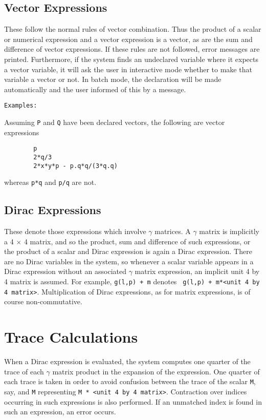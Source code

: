 \subsection{Vector Expressions} 

These follow the normal rules of vector combination. Thus the product of a
scalar or numerical expression and a vector expression is a vector, as are
the sum and difference of vector expressions. If these rules are not
followed, error messages are printed. Furthermore, if the system finds an
undeclared variable where it expects a vector variable, it will ask the
user in interactive mode whether to make that variable a vector or not. In
batch mode, the declaration will be made automatically and the user
informed of this by a message.

{\tt Examples:}

Assuming {\tt P} and {\tt Q} have been declared vectors, the following are
vector expressions
\begin{verbatim}
        p
        2*q/3
        2*x*y*p - p.q*q/(3*q.q)
\end{verbatim}
whereas {\tt p*q} and {\tt p/q} are not.

\subsection{Dirac Expressions}

These denote those expressions which involve $\gamma$ matrices. A $\gamma$
matrix is implicitly a 4 $\times$ 4 matrix, and so the product, sum and
difference of such expressions, or the product of a scalar and Dirac
expression is again a Dirac expression.  There are no Dirac variables in
the system, so whenever a scalar variable appears in a Dirac expression
without an associated $\gamma$ matrix expression, an implicit unit 4
by 4 matrix is assumed.  For example, {\tt g(l,p) + m} denotes {\tt
g(l,p) + m*<unit 4 by 4 matrix>}.  Multiplication of Dirac
expressions, as for matrix expressions, is of course non-commutative.

\section{Trace Calculations} 

When a Dirac expression is evaluated, the system computes one quarter of
the trace of each $\gamma$ matrix product in the expansion of the expression.
One quarter of each trace is taken in order to avoid confusion between the
trace of the scalar {\tt M}, say, and {\tt M} representing {\tt M * <unit
4 by 4 matrix>}.  Contraction over indices occurring in such expressions is
also performed.  If an unmatched index is found in such an expression, an
error occurs.


